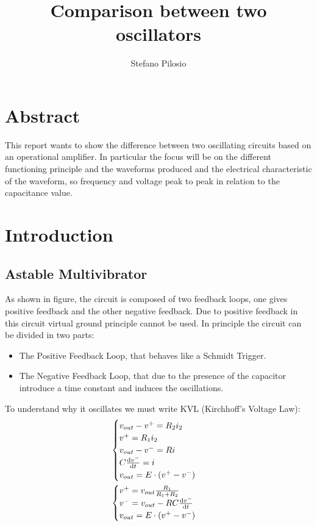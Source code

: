 \documentclass[a4paper, twocolumn]{article}
\begin{document}
\title{Comparison between two oscillators}
\author{Stefano Pilosio}

\maketitle

\section{Abstract}

This report wants to show the difference between two oscillating circuits based on an operational amplifier. In particular the focus will be on the different functioning principle and the waveforms produced and the electrical characteristic of the waveform, so frequency and voltage peak to peak in relation to the capacitance value.

\section{Introduction}

\subsection{Astable Multivibrator}


\begin{center}
    \centering
    \def \svgwidth{\columnwidth}
    
\end{center}

As shown in figure, the circuit is composed of two feedback loops, one gives positive feedback and the other negative feedback. Due to positive feedback in this circuit virtual ground principle cannot be used. In principle the circuit can be divided in two parts:

\begin{itemize}
    \item The Positive Feedback Loop, that behaves like a Schmidt Trigger.
    \item The Negative Feedback Loop, that due to the presence of the capacitor introduce a time constant and induces the oscillations.
\end{itemize}

To understand why it oscillates we must write KVL (Kirchhoff's Voltage Law):
\begin{gather}
    \begin{cases}
        v_{out} - v^+ = R_2i_2\\
        v^+= R_1i_2\\
        v_{out}-v^- = R i\\
        C\dv{v^-}{t}= i\\
        v_{out} = E \cdot (v^+-v^-)
    \end{cases}\\
    \begin{cases}
        \label{eq:genStable}
        v^+=v_{out}\frac{R_1}{R_1+R_2}\\
        v^-=v_{out}-RC\dv{v^-}{t}\\
        v_{out} = E \cdot (v^+-v^-)
    \end{cases}
\end{gather}
\end{document}
